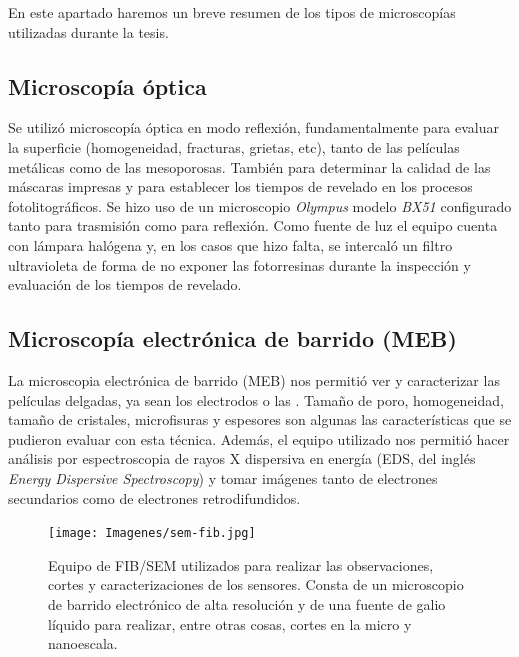 	 En este apartado haremos un breve resumen de los tipos de microscopías utilizadas durante la tesis.

	\subsection{Microscopía óptica}

		Se utilizó microscopía óptica en modo reflexión, fundamentalmente para evaluar la superficie (homogeneidad, fracturas, grietas, etc), tanto de las películas metálicas como de las mesoporosas. También para determinar la calidad de las máscaras impresas y para establecer los tiempos de revelado en los procesos fotolitográficos. Se hizo uso de un microscopio \textit{Olympus} modelo \textit{BX51} configurado tanto para trasmisión como para reflexión. Como fuente de luz el equipo cuenta con lámpara halógena y, en los casos que hizo falta, se intercaló un filtro ultravioleta de forma de no exponer las fotorresinas durante la inspección y evaluación de los tiempos de revelado.
	
	\subsection{Microscopía electrónica de barrido (MEB)}\label{sec:SEM}

		La microscopia electrónica de barrido (MEB) nos permitió ver y caracterizar las películas delgadas, ya sean los electrodos o las \pdm. Tamaño de poro, homogeneidad, tamaño de cristales, microfisuras y espesores son algunas las características que se pudieron evaluar con esta técnica. Además, el equipo utilizado nos permitió hacer análisis por espectroscopia de rayos X dispersiva en energía (EDS, del inglés \textit{Energy Dispersive Spectroscopy}) y tomar imágenes tanto de electrones secundarios como de electrones retrodifundidos. \cite{Goodhew2000,Watt1997}


			\begin{figure}[t!]
			 		  \begin{center}
			 		  \texttt{[image: Imagenes/sem-fib.jpg]}
			 		  \caption[Microscopio de doble haz FIB/SEM]{Equipo de FIB/SEM utilizados para realizar las observaciones, cortes y caracterizaciones de los sensores. Consta de un microscopio de barrido electrónico de alta resolución y de una fuente de galio líquido para realizar, entre otras cosas, cortes en la micro y nanoescala.}
			 		  \label{fig:sem-fib}
			 		  \end{center}
			 		  \end{figure}


